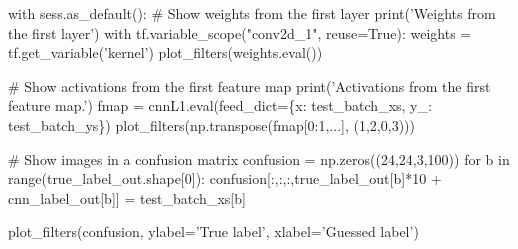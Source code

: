 \documentclass[11pt]{article}
\begin{document}
    with sess.as\_default(): \# Show weights from the first layer
print('Weights from the first layer') with
tf.variable\_scope("conv2d\_1", reuse=True): weights =
tf.get\_variable('kernel') plot\_filters(weights.eval())

\# Show activations from the first feature map print('Activations from
the first feature map.') fmap = cnnL1.eval(feed\_dict=\{x:
test\_batch\_xs, y\_: test\_batch\_ys\})
plot\_filters(np.transpose(fmap{[}0:1,...{]}, (1,2,0,3)))

\# Show images in a confusion matrix confusion = np.zeros((24,24,3,100))
for b in range(true\_label\_out.shape{[}0{]}):
confusion{[}:,:,:,true\_label\_out{[}b{]}*10 + cnn\_label\_out{[}b{]}{]}
= test\_batch\_xs{[}b{]}

plot\_filters(confusion, ylabel='True label', xlabel='Guessed label')


    
    
    
    
\end{document}
